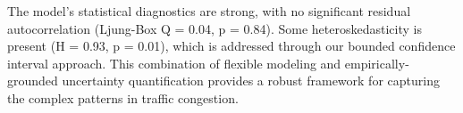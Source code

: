 \documentclass{article}
\begin{document}
The model's statistical diagnostics are strong, with no significant residual autocorrelation (Ljung-Box Q = 0.04, p = 0.84). Some heteroskedasticity is present (H = 0.93, p = 0.01), which is addressed through our bounded confidence interval approach. This combination of flexible modeling and empirically-grounded uncertainty quantification provides a robust framework for capturing the complex patterns in traffic congestion.
\end{document}
